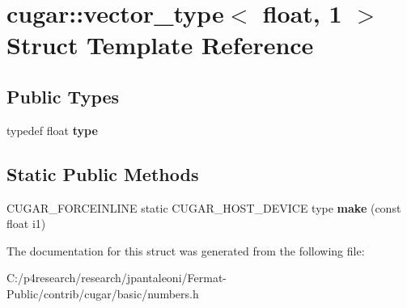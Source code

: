 \hypertarget{structcugar_1_1vector__type_3_01float_00_011_01_4}{}\section{cugar\+:\+:vector\+\_\+type$<$ float, 1 $>$ Struct Template Reference}
\label{structcugar_1_1vector__type_3_01float_00_011_01_4}
\subsection*{Public Types}
\begin{DoxyCompactItemize}
\item 
\mbox{\label{structcugar_1_1vector__type_3_01float_00_011_01_4_a52ea4ddad8b134027e8bac4aeb8fb9b3}} 
typedef float {\bfseries type}
\end{DoxyCompactItemize}
\subsection*{Static Public Methods}
\begin{DoxyCompactItemize}
\item 
\mbox{\label{structcugar_1_1vector__type_3_01float_00_011_01_4_a955811fa4e16ca88dbf3377980ba77cf}} 
C\+U\+G\+A\+R\+\_\+\+F\+O\+R\+C\+E\+I\+N\+L\+I\+NE static C\+U\+G\+A\+R\+\_\+\+H\+O\+S\+T\+\_\+\+D\+E\+V\+I\+CE type {\bfseries make} (const float i1)
\end{DoxyCompactItemize}


The documentation for this struct was generated from the following file\+:\begin{DoxyCompactItemize}
\item 
C\+:/p4research/research/jpantaleoni/\+Fermat-\/\+Public/contrib/cugar/basic/numbers.\+h\end{DoxyCompactItemize}

